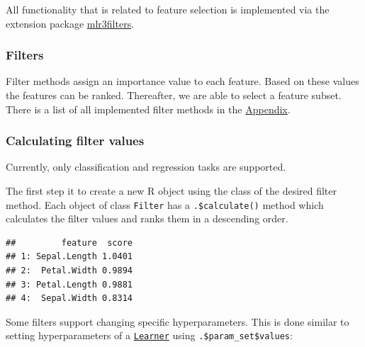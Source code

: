 \documentclass[]{article}
\newenvironment{Shaded}{\begin{snugshade}}{\end{snugshade}}
\newcommand{\KeywordTok}[1]{\textcolor[rgb]{0.13,0.29,0.53}{\textbf{#1}}}
\newcommand{\NormalTok}[1]{#1}
\newcommand{\OperatorTok}[1]{\textcolor[rgb]{0.81,0.36,0.00}{\textbf{#1}}}
\newcommand{\StringTok}[1]{\textcolor[rgb]{0.31,0.60,0.02}{#1}}
\renewenvironment{Shaded} {\begin{snugshade}\small} {\end{snugshade}}
\begin{document}
All functionality that is related to feature selection is implemented via the extension package \href{https://mlr3filters.mlr-org.com}{mlr3filters}.

\hypertarget{fs-filter}{%
\subsubsection{Filters}\label{fs-filter}}

Filter methods assign an importance value to each feature.
Based on these values the features can be ranked.
Thereafter, we are able to select a feature subset.
There is a list of all implemented filter methods in the \protect\hyperlink{list-filters}{Appendix}.

\hypertarget{fs-calc}{%
\subsubsection{Calculating filter values}\label{fs-calc}}

Currently, only classification and regression tasks are supported.

The first step it to create a new R object using the class of the desired filter method.
Each object of class \texttt{Filter} has a \texttt{.\$calculate()} method which calculates the filter values and ranks them in a descending order.

\begin{Shaded}
\end{Shaded}

\begin{verbatim}
##         feature  score
## 1: Sepal.Length 1.0401
## 2:  Petal.Width 0.9894
## 3: Petal.Length 0.9881
## 4:  Sepal.Width 0.8314
\end{verbatim}

Some filters support changing specific hyperparameters.
This is done similar to setting hyperparameters of a \href{https://mlr3.mlr-org.com/reference/Learner.html}{\texttt{Learner}} using \texttt{.\$param\_set\$values}:
\end{document}
